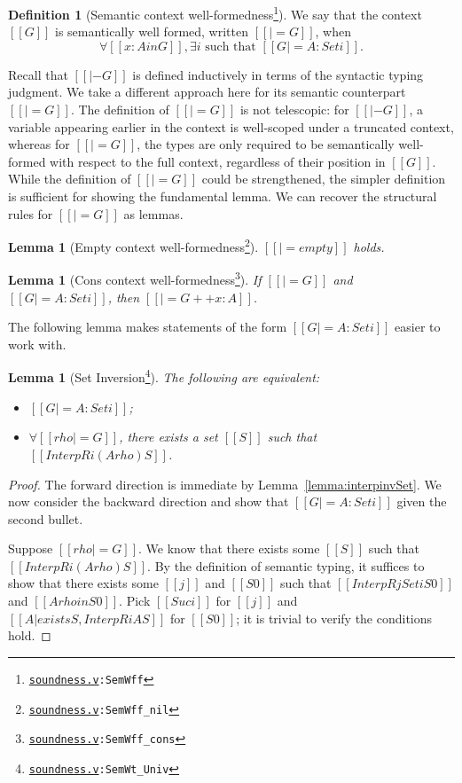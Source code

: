 \documentclass[\ifpublic nolinenum\else\fi,online,OA]{jfp}
\newcommand{\dotv}[2]{\href{#1}{\texttt{#1}}{\texttt{:#2}}}
\newtheorem{lemma}[theorem]{Lemma}
\theoremstyle{definition}
\newtheorem{definition}[theorem]{Definition}
\begin{document}
\begin{definition}[Semantic context well-formedness\footnote{\dotv{soundness.v}{SemWff}}]
  We say that the context $[[G]]$ is semantically well formed, written $[[|= G]]$, when
  \[ \forall [[x : A in G]], \exists i \text{ such that } [[G |= A : Set i]]. \]
\end{definition}

Recall that $[[|- G]]$ is defined inductively in terms of the
syntactic typing judgment. We take a different approach here for its
semantic counterpart $[[|= G]]$. The definition of
$[[|= G]]$ is not telescopic: for $[[|- G]]$, a variable appearing
earlier in the context is well-scoped under a truncated context,
whereas for $[[|= G]]$, the types are only required to be
semantically well-formed with respect to the full context, regardless of their
position in $[[G]]$. While the definition of $[[|= G]]$ could be strengthened,
the simpler definition is sufficient for showing the fundamental lemma.
We can recover the structural rules for $[[|= G]]$ as lemmas.

\begin{lemma}[Empty context well-formedness\footnote{\dotv{soundness.v}{SemWff\_nil}}]
  \label{lemma:semwffempty}
  $[[|= empty]]$ holds.
\end{lemma}
\begin{lemma}[Cons context well-formedness\footnote{\dotv{soundness.v}{SemWff\_cons}}]
  \label{lemma:semwffcons}
  If $[[|= G]]$ and $[[G |= A : Set i]]$, then $[[|= G ++ x : A]]$.
\end{lemma}

The following lemma makes statements of the form $[[G |= A : Set i]]$ easier to
work with.

\begin{lemma}[Set Inversion\footnote{\dotv{soundness.v}{SemWt\_Univ}}]
  \label{lemma:setinv}
  The following are equivalent:
  \begin{itemize}
  \item $[[G |= A : Set i]]$;
  \item $\forall [[rho |= G]]$, there exists a set $[[S]]$ such that
    $[[InterpR i (A {rho}) S]]$.
  \end{itemize}
\end{lemma}

\begin{proof}
  The forward direction is immediate by Lemma~\ref{lemma:interpinvSet}.
  We now consider the backward direction
  and show that $[[G |= A : Set i]]$ given the second bullet.

  Suppose $[[rho |= G]]$. We know that there exists some $[[S]]$
  such that $[[InterpR i (A {rho}) S]]$. By the definition of semantic
  typing, it suffices to show that there exists some $[[j]]$ and
  $[[S0]]$ such that  $[[InterpR j Set i S0]]$ and $[[A {rho} in
  S0]]$.
  Pick $[[Suc i]]$ for $[[j]]$ and $[[ { A | exists S , InterpR i A S }
  ]]$ for $[[S0]]$; it is trivial to verify the conditions hold.
\end{proof}
\end{document}
